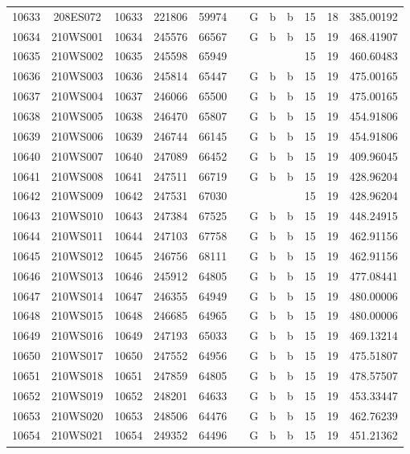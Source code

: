 \begin{tabular}{|*{12}{c|}}
10633 & 208ES072 & 10633 & 221806 & 59974 &  & G & b & b & 15 & 18 & 385.00192 \\ 
10634 & 210WS001 & 10634 & 245576 & 66567 &  & G & b & b & 15 & 19 & 468.41907 \\ 
10635 & 210WS002 & 10635 & 245598 & 65949 &  &  &  &  & 15 & 19 & 460.60483 \\ 
10636 & 210WS003 & 10636 & 245814 & 65447 &  & G & b & b & 15 & 19 & 475.00165 \\ 
10637 & 210WS004 & 10637 & 246066 & 65500 &  & G & b & b & 15 & 19 & 475.00165 \\ 
10638 & 210WS005 & 10638 & 246470 & 65807 &  & G & b & b & 15 & 19 & 454.91806 \\ 
10639 & 210WS006 & 10639 & 246744 & 66145 &  & G & b & b & 15 & 19 & 454.91806 \\ 
10640 & 210WS007 & 10640 & 247089 & 66452 &  & G & b & b & 15 & 19 & 409.96045 \\ 
10641 & 210WS008 & 10641 & 247511 & 66719 &  & G & b & b & 15 & 19 & 428.96204 \\ 
10642 & 210WS009 & 10642 & 247531 & 67030 &  &  &  &  & 15 & 19 & 428.96204 \\ 
10643 & 210WS010 & 10643 & 247384 & 67525 &  & G & b & b & 15 & 19 & 448.24915 \\ 
10644 & 210WS011 & 10644 & 247103 & 67758 &  & G & b & b & 15 & 19 & 462.91156 \\ 
10645 & 210WS012 & 10645 & 246756 & 68111 &  & G & b & b & 15 & 19 & 462.91156 \\ 
10646 & 210WS013 & 10646 & 245912 & 64805 &  & G & b & b & 15 & 19 & 477.08441 \\ 
10647 & 210WS014 & 10647 & 246355 & 64949 &  & G & b & b & 15 & 19 & 480.00006 \\ 
10648 & 210WS015 & 10648 & 246685 & 64965 &  & G & b & b & 15 & 19 & 480.00006 \\ 
10649 & 210WS016 & 10649 & 247193 & 65033 &  & G & b & b & 15 & 19 & 469.13214 \\ 
10650 & 210WS017 & 10650 & 247552 & 64956 &  & G & b & b & 15 & 19 & 475.51807 \\ 
10651 & 210WS018 & 10651 & 247859 & 64805 &  & G & b & b & 15 & 19 & 478.57507 \\ 
10652 & 210WS019 & 10652 & 248201 & 64633 &  & G & b & b & 15 & 19 & 453.33447 \\ 
10653 & 210WS020 & 10653 & 248506 & 64476 &  & G & b & b & 15 & 19 & 462.76239 \\ 
10654 & 210WS021 & 10654 & 249352 & 64496 &  & G & b & b & 15 & 19 & 451.21362 \\ 

\end{tabular}
